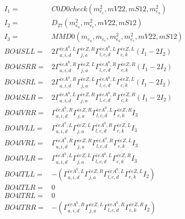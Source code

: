 \documentclass[A4,landscape]{article}
\begin{document}
\begin{align} 
I_1 = & C0D0check(m^2_{e_{{c}}}, mV22, mS12, m^2_{e_{{a}}}) \\ 
I_2 = & D_{27}(m^2_{e_{{a}}}, m^2_{e_{{c}}}, mV22, mS12) \\ 
I_3 = & MMD0(m_{e_{{a}}}, m_{e_{{c}}}, m^2_{e_{{a}}}, m^2_{e_{{c}}}, mV22, mS12) \\ 
  BO4lSLL= & 2  \Gamma^{\bar{e}e A^0 ,L}_{a, i, d} \Gamma^{\bar{e}e Z ,R}_{j, a} \Gamma^{\bar{e}e A^0 ,L}_{l, c, d} \Gamma^{\bar{e}e Z ,L}_{c, k} (I_1 - 2 I_2) \\ 
  BO4lSRR= & 2  \Gamma^{\bar{e}e A^0 ,R}_{a, i, d} \Gamma^{\bar{e}e Z ,L}_{j, a} \Gamma^{\bar{e}e A^0 ,R}_{l, c, d} \Gamma^{\bar{e}e Z ,R}_{c, k} (I_1 - 2 I_2) \\ 
  BO4lSRL= & 2  \Gamma^{\bar{e}e A^0 ,R}_{a, i, d} \Gamma^{\bar{e}e Z ,L}_{j, a} \Gamma^{\bar{e}e A^0 ,L}_{l, c, d} \Gamma^{\bar{e}e Z ,L}_{c, k} (I_1 - 2 I_2) \\ 
  BO4lSLR= & 2  \Gamma^{\bar{e}e A^0 ,L}_{a, i, d} \Gamma^{\bar{e}e Z ,R}_{j, a} \Gamma^{\bar{e}e A^0 ,R}_{l, c, d} \Gamma^{\bar{e}e Z ,R}_{c, k} (I_1 - 2 I_2) \\ 
  BO4lVRR= &  \Gamma^{\bar{e}e A^0 ,R}_{a, i, d} \Gamma^{\bar{e}e Z ,R}_{j, a} \Gamma^{\bar{e}e A^0 ,L}_{l, c, d} \Gamma^{\bar{e}e Z ,R}_{c, k} I_3 \\ 
  BO4lVLL= &  \Gamma^{\bar{e}e A^0 ,L}_{a, i, d} \Gamma^{\bar{e}e Z ,L}_{j, a} \Gamma^{\bar{e}e A^0 ,R}_{l, c, d} \Gamma^{\bar{e}e Z ,L}_{c, k} I_3 \\ 
  BO4lVRL= &  \Gamma^{\bar{e}e A^0 ,R}_{a, i, d} \Gamma^{\bar{e}e Z ,R}_{j, a} \Gamma^{\bar{e}e A^0 ,R}_{l, c, d} \Gamma^{\bar{e}e Z ,L}_{c, k} I_3 \\ 
  BO4lVLR= &  \Gamma^{\bar{e}e A^0 ,L}_{a, i, d} \Gamma^{\bar{e}e Z ,L}_{j, a} \Gamma^{\bar{e}e A^0 ,L}_{l, c, d} \Gamma^{\bar{e}e Z ,R}_{c, k} I_3 \\ 
  BO4lTLL= & -( \Gamma^{\bar{e}e A^0 ,L}_{a, i, d} \Gamma^{\bar{e}e Z ,R}_{j, a} \Gamma^{\bar{e}e A^0 ,L}_{l, c, d} \Gamma^{\bar{e}e Z ,L}_{c, k} I_2) \\ 
  BO4lTLR= & 0 \\ 
  BO4lTRL= & 0 \\ 
  BO4lTRR= & -( \Gamma^{\bar{e}e A^0 ,R}_{a, i, d} \Gamma^{\bar{e}e Z ,L}_{j, a} \Gamma^{\bar{e}e A^0 ,R}_{l, c, d} \Gamma^{\bar{e}e Z ,R}_{c, k} I_2) \\ 
\end{align} 
\end{document}
